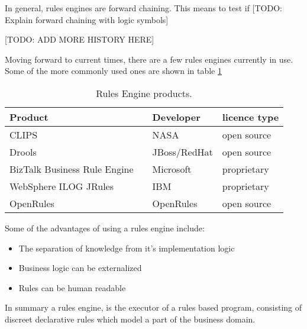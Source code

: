 In general, rules engines are forward chaining.  This means to test if 
[TODO: Explain forward chaining with logic symbols] 

[TODO: ADD MORE HISTORY HERE]

Moving forward to current times, there are a few rules engines currently in use.
Some of the more commonly used ones are shown in table \ref{table:RuleEngines}

\begin{table}
    \begin{center}
        \begin{tabular}{ |l c |l|l| } 
            \hline
            Product                      &                             & Developer    & licence type   \\
            \hline
            CLIPS                        & \cite{CLIPSProductPage}     & NASA         & open source    \\ 
            Drools                       & \cite{DroolsProductPage}    & JBoss/RedHat & open source    \\ 
            BizTalk Business Rule Engine & \cite{BiztalkProductPage}   & Microsoft    & proprietary    \\ 
            WebSphere ILOG JRules        & \cite{JRulesProductPage}    & IBM          & proprietary    \\ 
            OpenRules                    & \cite{OpenRulesProductPage} & OpenRules    & open source    \\ 
            \hline
        \end{tabular}
    \end{center}
    \caption{Rules Engine products.}
    \label{table:RuleEngines}
\end{table}

Some of the advantages of using a rules engine include:
\begin{itemize}
    \item The separation of knowledge from it's implementation logic
    \item Business logic can be externalized
    \item Rules can be human readable
\end{itemize}


In summary a rules engine, is the executor of a rules based program, consisting of discreet declarative rules which model a part of the business domain.







